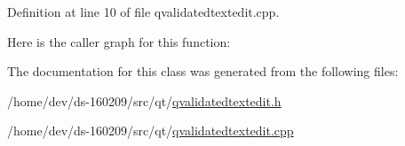 Definition at line 10 of file qvalidatedtextedit.\+cpp.



Here is the caller graph for this function\+:




The documentation for this class was generated from the following files\+:\begin{DoxyCompactItemize}
\item 
/home/dev/ds-\/160209/src/qt/\hyperlink{qvalidatedtextedit_8h}{qvalidatedtextedit.\+h}\item 
/home/dev/ds-\/160209/src/qt/\hyperlink{qvalidatedtextedit_8cpp}{qvalidatedtextedit.\+cpp}\end{DoxyCompactItemize}
